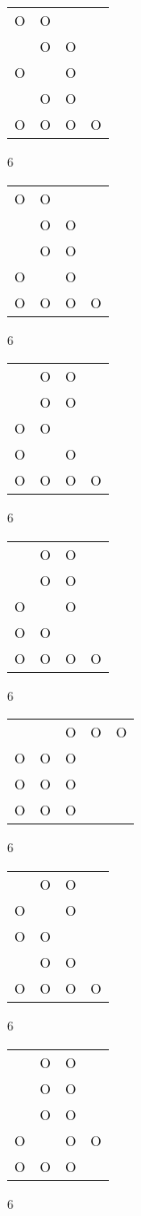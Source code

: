 \begin{tabular}{|m{0.2cm}m{0.2cm}m{0.2cm}m{0.2cm}|}\hline
O&O& & \\
 &O&O& \\
O& &O& \\
 &O&O& \\
O&O&O&O\\
\hline\end{tabular}6
\begin{tabular}{|m{0.2cm}m{0.2cm}m{0.2cm}m{0.2cm}|}\hline
O&O& & \\
 &O&O& \\
 &O&O& \\
O& &O& \\
O&O&O&O\\
\hline\end{tabular}6
\begin{tabular}{|m{0.2cm}m{0.2cm}m{0.2cm}m{0.2cm}|}\hline
 &O&O& \\
 &O&O& \\
O&O& & \\
O& &O& \\
O&O&O&O\\
\hline\end{tabular}6
\begin{tabular}{|m{0.2cm}m{0.2cm}m{0.2cm}m{0.2cm}|}\hline
 &O&O& \\
 &O&O& \\
O& &O& \\
O&O& & \\
O&O&O&O\\
\hline\end{tabular}6
\begin{tabular}{|m{0.2cm}m{0.2cm}m{0.2cm}m{0.2cm}m{0.2cm}|}\hline
 & &O&O&O\\
O&O&O& & \\
O&O&O& & \\
O&O&O& & \\
\hline\end{tabular}6
\begin{tabular}{|m{0.2cm}m{0.2cm}m{0.2cm}m{0.2cm}|}\hline
 &O&O& \\
O& &O& \\
O&O& & \\
 &O&O& \\
O&O&O&O\\
\hline\end{tabular}6
\begin{tabular}{|m{0.2cm}m{0.2cm}m{0.2cm}m{0.2cm}|}\hline
 &O&O& \\
 &O&O& \\
 &O&O& \\
O& &O&O\\
O&O&O& \\
\hline\end{tabular}6
